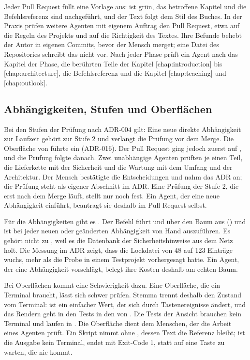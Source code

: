 Jeder Pull Request füllt eine Vorlage aus:
 ist grün, das betroffene Kapitel und die Befehlsreferenz sind nachgeführt,
und der Text folgt dem Stil des Buches.
In der Praxis prüfen weitere Agenten mit eigenem Auftrag den Pull Request,
etwa auf die Regeln des Projekts und auf die Richtigkeit des Textes.
Ihre Befunde behebt der Autor in eigenen Commits, bevor der Mensch merget;
eine Datei des Repositories schreibt das nicht vor.
Nach jeder Phase prüft ein Agent nach 
das Kapitel der Phase,
die berührten Teile der Kapitel \in{}[chap:introduction] bis \in{}[chap:architecture],
die Befehlsreferenz und die Kapitel \in{}[chap:teaching] und \in{}[chap:outlook].

\subsection{Abhängigkeiten, Stufen und Oberflächen}

Bei den Stufen der Prüfung nach ADR-004 gilt:
Eine neue direkte Abhängigkeit zur Laufzeit gehört zur Stufe 2 und verlangt die Prüfung
vor dem Merge.
Die Oberfläche von  führte  ein (ADR-016).
Der Pull Request ging jedoch zuerst auf , und die Prüfung folgte danach.
Zwei unabhängige Agenten prüften je einen Teil, die Lieferkette mit der Sicherheit
und die Wartung mit dem Umfang und der Architektur.
Der Mensch bestätigte die Entscheidungen und nahm das ADR an;
die Prüfung steht als eigener Abschnitt im ADR.
Eine Prüfung der Stufe 2, die erst nach dem Merge läuft, stellt nur noch fest.
Ein Agent, der eine neue Abhängigkeit einführt, beantragt sie deshalb im Pull Request selbst.

Für die Abhängigkeiten gibt es .
Der Befehl führt  und  über den Baum aus
() und ist bei jeder neuen oder geänderten Abhängigkeit von Hand auszuführen.
Es gehört nicht zu , weil es die Datenbank der Sicherheitshinweise aus dem Netz holt.
Die Messung im ADR zeigt, dass die Lockdatei von 48 auf 123 Einträge wuchs,
mehr als die Probe in einem Testprojekt vorhergesagt hatte.
Ein Agent, der eine Abhängigkeit vorschlägt, belegt ihre Kosten deshalb am echten Baum.

Bei Oberflächen kommt eine Schwierigkeit dazu.
Eine Oberfläche, die ein Terminal braucht, lässt sich schwer prüfen.
Stemma trennt deshalb den Zustand vom Terminal:  ist ein einfacher Wert,
der sich durch Tastenereignisse ändert, und das Rendern geht in den Tests in den 
von .
Die Tests der Ansicht brauchen kein Terminal und laufen in .
Die Oberfläche dient dem Menschen, der die Arbeit eines Agenten prüft.
Ein Skript nimmt  ohne , dessen Text die Referenz bleibt;
ist die Ausgabe kein Terminal, endet  mit Exit-Code 1,
statt auf eine Taste zu warten, die nie kommt.

